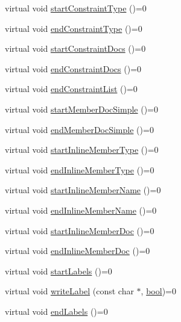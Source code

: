\begin{DoxyCompactItemize}
\item 
virtual void \hyperlink{class_output_generator_a6f24ed1e9572bbc6de4c533129a4d28a}{start\+Constraint\+Type} ()=0
\item 
virtual void \hyperlink{class_output_generator_a7abed59bb311949ab7cae21a009485cf}{end\+Constraint\+Type} ()=0
\item 
virtual void \hyperlink{class_output_generator_a81ade540356d6c7669c6c701bde02e10}{start\+Constraint\+Docs} ()=0
\item 
virtual void \hyperlink{class_output_generator_a079c2400a911349969e61531d72c554e}{end\+Constraint\+Docs} ()=0
\item 
virtual void \hyperlink{class_output_generator_a0998d070dc2c5d9ba203a8c58b7b1b73}{end\+Constraint\+List} ()=0
\item 
virtual void \hyperlink{class_output_generator_a8eb36caa0f5a620b42d7e332fb849ae4}{start\+Member\+Doc\+Simple} ()=0
\item 
virtual void \hyperlink{class_output_generator_acf16c793f7f93b9508382eaec818f7f8}{end\+Member\+Doc\+Simple} ()=0
\item 
virtual void \hyperlink{class_output_generator_a590cf1aa2c7061dd15916a1459690445}{start\+Inline\+Member\+Type} ()=0
\item 
virtual void \hyperlink{class_output_generator_abae7a78f520dbd4336d093b8580bc5dd}{end\+Inline\+Member\+Type} ()=0
\item 
virtual void \hyperlink{class_output_generator_a0a3424e053c9ce5e63f5c8f3805aa940}{start\+Inline\+Member\+Name} ()=0
\item 
virtual void \hyperlink{class_output_generator_a64fd29eded2398a03ab98de61423f9be}{end\+Inline\+Member\+Name} ()=0
\item 
virtual void \hyperlink{class_output_generator_a6f40ca8e90e8167136b678efbe6bf131}{start\+Inline\+Member\+Doc} ()=0
\item 
virtual void \hyperlink{class_output_generator_a59987a7b4a41789d80dd788b0f65c434}{end\+Inline\+Member\+Doc} ()=0
\item 
virtual void \hyperlink{class_output_generator_af317d904e65624244c58368deabcba55}{start\+Labels} ()=0
\item 
virtual void \hyperlink{class_output_generator_a40864f2cdb9de3605965ec2912c3709d}{write\+Label} (const char $\ast$, \hyperlink{qglobal_8h_a1062901a7428fdd9c7f180f5e01ea056}{bool})=0
\item 
virtual void \hyperlink{class_output_generator_a13875bb6d9d678dac1ae21b3ad97127a}{end\+Labels} ()=0
\end{DoxyCompactItemize}
